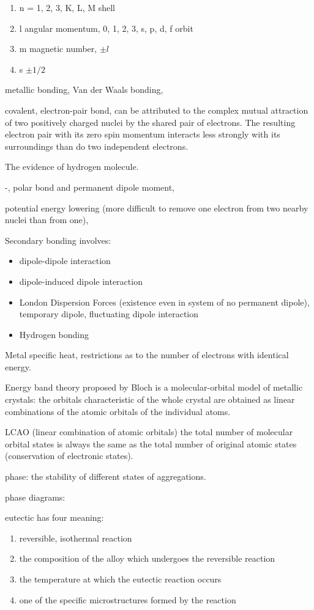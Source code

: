 \begin{enumerate}
\item n = 1, 2, 3, K, L, M shell
\item l angular momentum, 0, 1, 2, 3, s, p, d, f orbit
\item m magnetic number, $\pm l$
\item s $\pm 1/2$
\end{enumerate}

metallic bonding, Van der Waals bonding, 

covalent, electron-pair bond, can be attributed to the complex mutual attraction of two positively charged nuclei by the shared pair of electrons. The resulting electron pair with its zero spin momentum interacts less strongly with its surroundings than do two independent electrons. 

The evidence of hydrogen molecule. 

-, polar bond and permanent dipole moment,

potential energy lowering (more difficult to remove one electron from two nearby nuclei than from one), 

Secondary bonding involves:
\begin{itemize}
\item dipole-dipole interaction
\item dipole-induced dipole interaction
\item London Dispersion Forces (existence even in system of no permanent dipole), temporary dipole, fluctuating dipole interaction
\item Hydrogen bonding
\end{itemize}

Metal specific heat, restrictions as to the number of electrons with identical energy. 

Energy band theory proposed by Bloch is a molecular-orbital model of metallic crystals: the orbitals characteristic of the whole crystal are obtained as linear combinations of the atomic orbitals of the individual atoms. 

LCAO (linear combination of atomic orbitals) the total number of molecular orbital states is always the same as the total number of original atomic states (conservation of electronic states). 

phase: the stability of different states of aggregations.

phase diagrams: 

eutectic has four meaning:
\begin{enumerate}
\item reversible, isothermal reaction
\item the composition of the alloy which undergoes the reversible reaction
\item the temperature at which the eutectic reaction occurs
\item one of the specific microstructures formed by the reaction
\end{enumerate}

